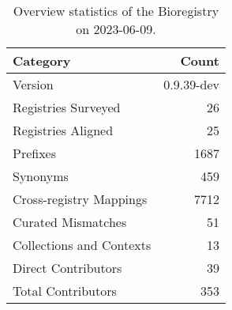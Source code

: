 \begin{table}
\caption{Overview statistics of the Bioregistry on 2023-06-09.}
\label{tab:bioregistry-summary}
\begin{tabular}{lr}
\toprule
Category & Count \\
\midrule
Version & 0.9.39-dev \\
Registries Surveyed & 26 \\
Registries Aligned & 25 \\
Prefixes & 1687 \\
Synonyms & 459 \\
Cross-registry Mappings & 7712 \\
Curated Mismatches & 51 \\
Collections and Contexts & 13 \\
Direct Contributors & 39 \\
Total Contributors & 353 \\
\bottomrule
\end{tabular}
\end{table}
